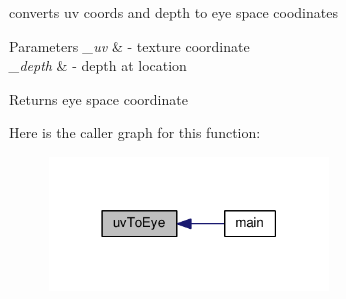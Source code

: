 converts uv coords and depth to eye space coodinates 


\begin{DoxyParams}{Parameters}
{\em \-\_\-uv} & -\/ texture coordinate \\
\hline
{\em \-\_\-depth} & -\/ depth at location \\
\hline
\end{DoxyParams}
\begin{DoxyReturn}{Returns}
eye space coordinate 
\end{DoxyReturn}


Here is the caller graph for this function\-:\nopagebreak
\begin{figure}[H]
\begin{center}
\leavevmode
\includegraphics[width=210pt]{fluid_shader_frag_8glsl_abd810f8b2d0a0892c1c9d96228c3017d_icgraph}
\end{center}
\end{figure}


